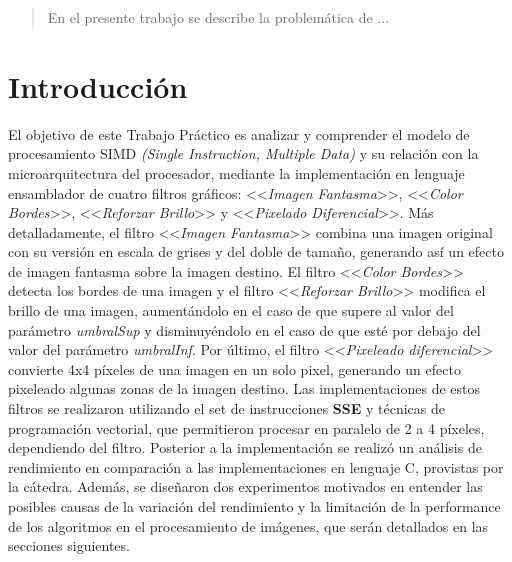 \documentclass[a4paper]{article}
\begin{document}
\thispagestyle{empty}

\maketitle
\newpage

\thispagestyle{empty}
\vfill
\begin{abstract}
En el presente trabajo se describe la problemática de ...
\end{abstract}

\thispagestyle{empty}
\vspace{3cm}
\tableofcontents
\newpage


\newpage

\section{Introducción}

\justify
El objetivo de este Trabajo Práctico es analizar y comprender el modelo de procesamiento SIMD \textit{(Single Instruction, Multiple Data)} y su relación con la microarquitectura del procesador, mediante la implementación en lenguaje ensamblador de cuatro filtros gráficos: <<\textit{Imagen Fantasma}>>, <<\textit{Color Bordes}>>, <<\textit{Reforzar Brillo}>> y <<\textit{Pixelado Diferencial}>>.
\justify
Más detalladamente, el filtro <<\textit{Imagen Fantasma}>> combina una imagen original con su versión en escala de grises y del doble de tamaño, generando así un  efecto de imagen fantasma sobre la imagen destino. El filtro <<\textit{Color Bordes}>> detecta los bordes de una  imagen y el filtro <<\textit{Reforzar Brillo}>> modifica el brillo de una imagen, aumentándolo en el caso de que  supere al valor del parámetro \textit{umbralSup} y disminuyéndolo en el caso de que esté por debajo del valor  del parámetro \textit{umbralInf}. Por último, el filtro <<\textit{Pixeleado diferencial}>> convierte 4x4 píxeles de una imagen en un solo pixel, generando un efecto pixeleado algunas zonas de la imagen destino. 
\justify
\indent Las implementaciones de estos filtros se realizaron utilizando el set de instrucciones \textbf{SSE} y técnicas de programación vectorial, que permitieron procesar en paralelo de 2 a 4 píxeles, dependiendo del filtro. Posterior a la implementación se realizó un análisis de rendimiento en comparación a las implementaciones en lenguaje C, provistas por la cátedra. Además, se diseñaron dos experimentos motivados en entender las posibles causas de la variación del rendimiento y la limitación de la performance de los algoritmos en el procesamiento de imágenes, que serán detallados en las secciones siguientes.  
\end{document}
